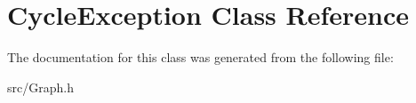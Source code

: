 \hypertarget{class_cycle_exception}{}\section{Cycle\+Exception Class Reference}
\label{class_cycle_exception}


The documentation for this class was generated from the following file\+:\begin{DoxyCompactItemize}
\item 
src/Graph.\+h\end{DoxyCompactItemize}
